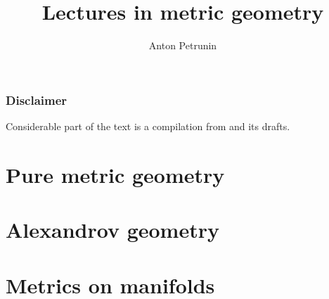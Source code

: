\documentclass[twoside]{book}
\begin{document}
 
\title{Lectures in metric geometry}
\author{Anton Petrunin}
\date{}
\maketitle



\section*{Disclaimer}

Considerable part of the text is a compilation from \cite{alexander-kapovitch-petrunin-2019, alexander-kapovitch-petrunin-2025, petrunin-yashinski, petrunin-2009, petrunin-zamorabarrera} and its drafts.

\thispagestyle{empty}
\tableofcontents
\thispagestyle{empty}


\part{Pure metric geometry}





\part{Alexandrov geometry}






\part{Metrics on manifolds}

%
\appendix

%
{
\printbibliography[heading=bibintoc]
\fussy
}
\end{document}
